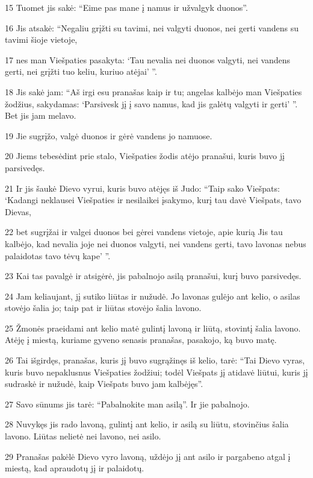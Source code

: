\par 15 Tuomet jis sakė: “Eime pas mane į namus ir užvalgyk duonos”. 
\par 16 Jis atsakė: “Negaliu grįžti su tavimi, nei valgyti duonos, nei gerti vandens su tavimi šioje vietoje, 
\par 17 nes man Viešpaties pasakyta: ‘Tau nevalia nei duonos valgyti, nei vandens gerti, nei grįžti tuo keliu, kuriuo atėjai’ ”. 
\par 18 Jis sakė jam: “Aš irgi esu pranašas kaip ir tu; angelas kalbėjo man Viešpaties žodžius, sakydamas: ‘Parsivesk jį į savo namus, kad jis galėtų valgyti ir gerti’ ”. Bet jis jam melavo. 
\par 19 Jie sugrįžo, valgė duonos ir gėrė vandens jo namuose. 
\par 20 Jiems tebesėdint prie stalo, Viešpaties žodis atėjo pranašui, kuris buvo jį parsivedęs. 
\par 21 Ir jis šaukė Dievo vyrui, kuris buvo atėjęs iš Judo: “Taip sako Viešpats: ‘Kadangi neklausei Viešpaties ir nesilaikei įsakymo, kurį tau davė Viešpats, tavo Dievas, 
\par 22 bet sugrįžai ir valgei duonos bei gėrei vandens vietoje, apie kurią Jis tau kalbėjo, kad nevalia joje nei duonos valgyti, nei vandens gerti, tavo lavonas nebus palaidotas tavo tėvų kape’ ”. 
\par 23 Kai tas pavalgė ir atsigėrė, jis pabalnojo asilą pranašui, kurį buvo parsivedęs. 
\par 24 Jam keliaujant, jį sutiko liūtas ir nužudė. Jo lavonas gulėjo ant kelio, o asilas stovėjo šalia jo; taip pat ir liūtas stovėjo šalia lavono. 
\par 25 Žmonės praeidami ant kelio matė gulintį lavoną ir liūtą, stovintį šalia lavono. Atėję į miestą, kuriame gyveno senasis pranašas, pasakojo, ką buvo matę. 
\par 26 Tai išgirdęs, pranašas, kuris jį buvo sugrąžinęs iš kelio, tarė: “Tai Dievo vyras, kuris buvo nepaklusnus Viešpaties žodžiui; todėl Viešpats jį atidavė liūtui, kuris jį sudraskė ir nužudė, kaip Viešpats buvo jam kalbėjęs”. 
\par 27 Savo sūnums jis tarė: “Pabalnokite man asilą”. Ir jie pabalnojo. 
\par 28 Nuvykęs jis rado lavoną, gulintį ant kelio, ir asilą su liūtu, stovinčius šalia lavono. Liūtas nelietė nei lavono, nei asilo. 
\par 29 Pranašas pakėlė Dievo vyro lavoną, uždėjo jį ant asilo ir pargabeno atgal į miestą, kad apraudotų jį ir palaidotų. 

